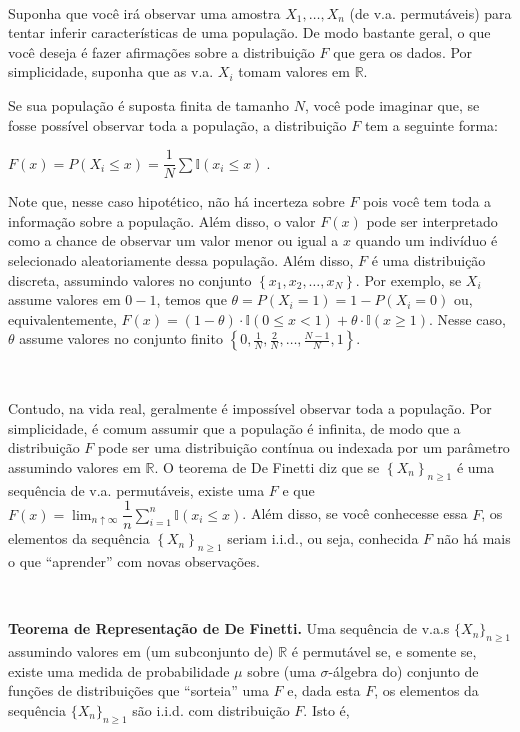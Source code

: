 \documentclass[
]{book}
\begin{document}
\(~\)

Suponha que você irá observar uma amostra \(X_1,\ldots,X_n\) (de v.a. permutáveis) para tentar inferir características de uma população. De modo bastante geral, o que você deseja é fazer afirmações sobre a distribuição \(F\) que gera os dados. Por simplicidade, suponha que as v.a. \(X_i\) tomam valores em \(\mathbb{R}\).

Se sua população é suposta finita de tamanho \(N\), você pode imaginar que, se fosse possível observar toda a população, a distribuição \(F\) tem a seguinte forma:

\(F(x) = P(X_i \leq x) = \dfrac{1}{N} \sum \mathbb{I}(x_i\leq x)~.\)

Note que, nesse caso hipotético, não há incerteza sobre \(F\) pois você tem toda a informação sobre a população. Além disso, o valor \(F(x)\) pode ser interpretado como a chance de observar um valor menor ou igual a \(x\) quando um indivíduo é selecionado aleatoriamente dessa população. Além disso, \(F\) é uma distribuição discreta, assumindo valores no conjunto \(\left\{x_1,x_2,\ldots,x_N\right\}\). Por exemplo, se \(X_i\) assume valores em \(0-1\), temos que \(\theta=P(X_i=1)=1-P(X_i=0)\) ou, equivalentemente, \(F(x)=(1-\theta)\cdot\mathbb{I}(0\leq x<1)+\theta\cdot\mathbb{I}(x\geq 1)\). Nesse caso, \(\theta\) assume valores no conjunto finito \(\left\{0,\frac{1}{N},\frac{2}{N}, \ldots,\frac{N-1}{N},1\right\}\).

\(~\)

Contudo, na vida real, geralmente é impossível observar toda a população. Por simplicidade, é comum assumir que a população é infinita, de modo que a distribuição \(F\) pode ser uma distribuição contínua ou indexada por um parâmetro assumindo valores em \(\mathbb{R}\). O teorema de De Finetti diz que se \(\left\{X_n\right\}_{n\geq 1}\) é uma sequência de v.a. permutáveis, existe uma \(F\) e que \(F(x)=\displaystyle\lim_{n\uparrow\infty}\dfrac{1}{n}\sum_{i=1}^{n}\mathbb{I}(x_i\leq x)\). Além disso, se você conhecesse essa \(F\), os elementos da sequência \(\left\{X_n\right\}_{n\geq 1}\) seriam i.i.d., ou seja, conhecida \(F\) não há mais o que ``aprender'' com novas observações.

\(~\)

\textbf{Teorema de Representação de De Finetti.} Uma sequência de v.a.s \(\{X_n\}_{n\geq 1}\) assumindo valores em (um subconjunto de) \(\mathbb R\) é permutável se, e somente se, existe uma medida de probabilidade \(\mu\) sobre (uma \(\sigma\)-álgebra do) conjunto de funções de distribuições que ``sorteia'' uma \(F\) e, dada esta \(F\), os elementos da sequência \(\{X_n\}_{n\geq 1}\) são i.i.d. com distribuição \(F\). Isto é,
\end{document}
